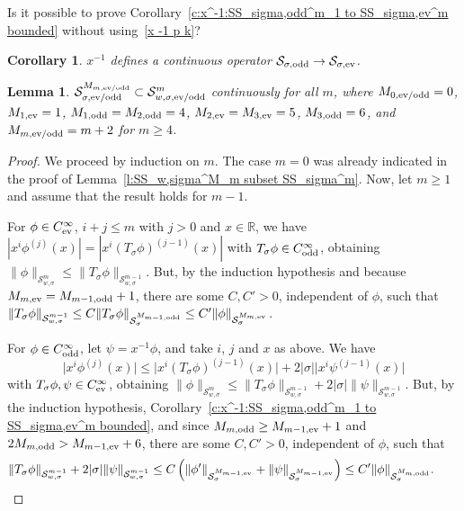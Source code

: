 \documentclass[pdftex]{sigma}
\newtheorem{Corollary}[Theorem]{Corollary}
\newtheorem{Lemma}[Theorem]{Lemma}
\newcommand{\R}{\mathbb{R}}
\renewcommand{\SS}{\mathcal{S}}
\newcommand{\Cinf}{C^\infty}
\begin{document}
\begin{quest}
  Is it possible to prove Corollary~\ref{c:x^-1:SS_sigma,odd^m_1 to SS_sigma,ev^m bounded} without using~\eqref{x -1 p k}?
\end{quest}


\begin{Corollary}\label{c:x^-1 continuous}
  $x^{-1}$ defines a continuous operator $\SS_{\sigma,\text{\rm odd}}\to\SS_{\sigma,\text{\rm ev}}$.
\end{Corollary}

\begin{Lemma}\label{l:SS_sigma^m+2 subset SS_w,sigma^m}
  $\SS_{\sigma,\text{\rm ev/odd}}^{M_{m,\text{\rm ev/odd}}}\subset\SS_{w,\sigma,\text{\rm ev/odd}}^m$ continuously for all $m$, where $M_{0,\text{\rm ev/odd}}=0$, $M_{1,\text{\rm ev}}=1$, $M_{1,\text{\rm odd}}=M_{2,\text{\rm odd}}=4$, $M_{2,\text{\rm ev}}=M_{3,\text{\rm ev}}=5$, $M_{3,\text{\rm odd}}=6$, and $M_{m,\text{\rm ev/odd}}=m+2$ for $m\ge4$.
\end{Lemma}

\begin{proof}
  We proceed by induction on $m$. The case $m=0$ was already indicated in the proof of Lemma~\ref{l:SS_w,sigma^M_m subset SS_sigma^m}. Now, let $m\ge1$ and assume that the result holds for $m-1$.

  For $\phi\in \Cinf_{\text{\rm ev}}$, $i+j\le m$ with $j>0$ and $x\in\R$, we have $|x^i\phi^{(j)}(x)|=|x^i(T_\sigma\phi)^{(j-1)}(x)|$ with $T_\sigma\phi\in \Cinf_{\text{\rm odd}}$, obtaining $\|\phi\|_{\SS_{w,\sigma}^m}\le\|T_\sigma\phi\|_{\SS_{w,\sigma}^{m-1}}$. But, by the induction hypothesis and because $M_{m,\text{\rm ev}}=M_{m-1,\text{\rm odd}}+1$, there are some $C,C'>0$, independent of $\phi$, such that $\|T_\sigma\phi\|_{\SS_{w,\sigma}^{m-1}}\le C \|T_\sigma\phi\|_{\SS_\sigma^{M_{m-1,\text{\rm odd}}}}\le C' \|\phi\|_{\SS_\sigma^{M_{m,\text{\rm ev}}}}$.

  For $\phi\in \Cinf_{\text{\rm odd}}$, let $\psi=x^{-1}\phi$, and take $i$, $j$ and $x$ as above. We have
    \[
      \big|x^i\phi^{(j)}(x)\big|\le\big|x^i(T_\sigma\phi)^{(j-1)}(x)\big|
      +2 |\sigma|\big|x^i\psi^{(j-1)}(x)\big|
    \]
  with $T_\sigma\phi,\psi\in\Cinf_{\text{\rm ev}}$, obtaining $ \|\phi\|_{\SS_{w,\sigma}^m}\le\|T_\sigma\phi\|_{\SS_{w,\sigma}^{m-1}}
      +2 |\sigma| \|\psi\|_{\SS_{w,\sigma}^{m-1}}$. But, by the induction hypothesis, Corollary~\ref{c:x^-1:SS_sigma,odd^m_1 to SS_sigma,ev^m bounded}, and since $M_{m,\text{\rm odd}}\ge M_{m-1,\text{\rm ev}}+1$ and $2M_{m,\text{\rm odd}}>M_{m-1,\text{\rm ev}}+6$, there are some $C,C'>0$, independent of $\phi$, such that
    \begin{gather*}
      \|T_\sigma\phi\|_{\SS_{w,\sigma}^{m-1}}+2 |\sigma| \|\psi\|_{\SS_{w,\sigma}^{m-1}}
      \le C\left(\|\phi'\|_{\SS_\sigma^{M_{m-1,\text{\rm ev}}}}+\|\psi\|_{\SS_\sigma^{M_{m-1,\text{\rm ev}}}}\right)
      \le C' \|\phi\|_{\SS_\sigma^{M_{m,\text{\rm odd}}}} .\tag*{\qed}
    \end{gather*}
\renewcommand{\qed}{}
\end{proof}
\end{document}
